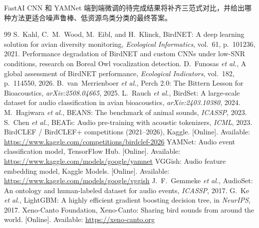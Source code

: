 \documentclass[conference]{IEEEtran}
\begin{document}
FastAI CNN 和 YAMNet 端到端微调的待完成结果将补齐三范式对比，并给出哪种方法更适合噪声鲁棒、低资源鸟类分类的最终答案。


\begin{thebibliography}{99}
S.~Kahl, C.~M.~Wood, M.~Eibl, and H.~Klinck, BirdNET: A deep learning solution for avian diversity monitoring, \emph{Ecological Informatics}, vol.~61, p.~101236, 2021.
Performance degradation of BirdNET and custom CNNs under low-SNR conditions, research on Boreal Owl vocalization detection.
D.~Funosas \emph{et al.}, A global assessment of BirdNET performance, \emph{Ecological Indicators}, vol.~182, p.~114550, 2026.
B.~van~Merrienboer \emph{et al.}, Perch 2.0: The Bittern Lesson for Bioacoustics, \emph{arXiv:2508.04665}, 2025.
L.~Rauch \emph{et al.}, BirdSet: A large-scale dataset for audio classification in avian bioacoustics, \emph{arXiv:2403.10380}, 2024.
M.~Hagiwara \emph{et al.}, BEANS: The benchmark of animal sounds, \emph{ICASSP}, 2023.
S.~Chen \emph{et al.}, BEATs: Audio pre-training with acoustic tokenizers, \emph{ICML}, 2023.
BirdCLEF / BirdCLEF+ competitions (2021--2026), Kaggle. [Online]. Available: \url{https://www.kaggle.com/competitions/birdclef-2026}
YAMNet: Audio event classification model, TensorFlow Hub. [Online]. Available: \url{https://www.kaggle.com/models/google/yamnet}
VGGish: Audio feature embedding model, Kaggle Models. [Online]. Available: \url{https://www.kaggle.com/models/google/vggish}
J.~F.~Gemmeke \emph{et al.}, AudioSet: An ontology and human-labeled dataset for audio events, \emph{ICASSP}, 2017.
G.~Ke \emph{et al.}, LightGBM: A highly efficient gradient boosting decision tree, in \emph{NeurIPS}, 2017.
Xeno-Canto Foundation, Xeno-Canto: Sharing bird sounds from around the world. [Online]. Available: \url{https://xeno-canto.org}
\end{thebibliography}
\end{document}
